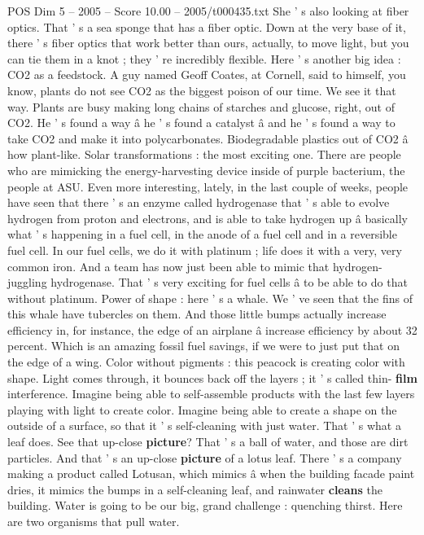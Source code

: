 \begin{textsample}{POS Dim 5 – 2005 – Score 10.00 – 2005/t000435.txt}
She ' s also looking at fiber optics.
That ' s a sea sponge that has a fiber optic.
Down at the very base of it, there ' s fiber optics that work better than ours, actually, to move light, but you can tie them in a knot ; they ' re incredibly flexible.
Here ' s another big idea : CO2 as a feedstock.
A guy named Geoff Coates, at Cornell, said to himself, you know, plants do not see CO2 as the biggest poison of our time.
We see it that way.
Plants are busy making long chains of starches and glucose, right, out of CO2.
He ' s found a way â he ' s found a catalyst â and he ' s found a way to take CO2 and make it into polycarbonates.
Biodegradable plastics out of CO2 â how plant-like.
Solar transformations : the most exciting one.
There are people who are mimicking the energy-harvesting device inside of purple bacterium, the people at ASU.
Even more interesting, lately, in the last couple of weeks, people have seen that there ' s an enzyme called hydrogenase that ' s able to evolve hydrogen from proton and electrons, and is able to take hydrogen up â basically what ' s happening in a fuel cell, in the anode of a fuel cell and in a reversible fuel cell.
In our fuel cells, we do it with platinum ; life does it with a very, very common iron.
And a team has now just been able to mimic that hydrogen-juggling hydrogenase.
That ' s very exciting for fuel cells â to be able to do that without platinum.
Power of shape : here ' s a whale.
We ' ve seen that the fins of this whale have tubercles on them.
And those little bumps actually increase efficiency in, for instance, the edge of an airplane â increase efficiency by about 32 percent.
Which is an amazing fossil fuel savings, if we were to just put that on the edge of a wing.
Color without pigments : this peacock is creating color with shape.
Light comes through, it bounces back off the layers ; it ' s called thin- \textbf{film} interference.
Imagine being able to self-assemble products with the last few layers playing with light to create color.
Imagine being able to create a shape on the outside of a surface, so that it ' s self-cleaning with just water.
That ' s what a leaf does.
See that up-close \textbf{picture}?
That ' s a ball of water, and those are dirt particles.
And that ' s an up-close \textbf{picture} of a lotus leaf.
There ' s a company making a product called Lotusan, which mimics â when the building facade paint dries, it mimics the bumps in a self-cleaning leaf, and rainwater \textbf{cleans} the building.
Water is going to be our big, grand challenge : quenching thirst.
Here are two organisms that pull water.

\end{textsample}

